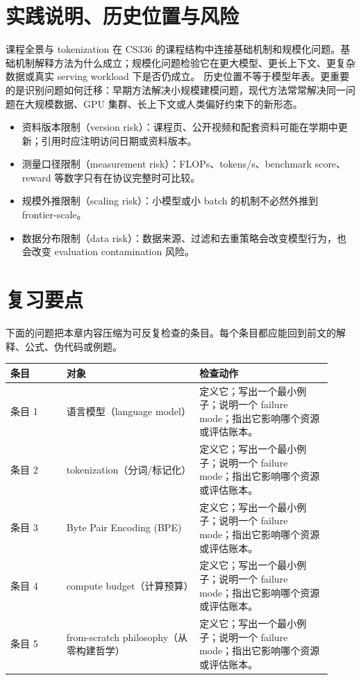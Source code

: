 \documentclass[a4paper]{article}
\begin{document}
\section{实践说明、历史位置与风险}
课程全景与 tokenization 在 CS336 的课程结构中连接基础机制和规模化问题。基础机制解释方法为什么成立；规模化问题检验它在更大模型、更长上下文、更复杂数据或真实 serving workload 下是否仍成立。
历史位置不等于模型年表。更重要的是识别问题如何迁移：早期方法解决小规模建模问题，现代方法常常解决同一问题在大规模数据、GPU 集群、长上下文或人类偏好约束下的新形态。
\begin{itemize}
\item 资料版本限制（version risk）：课程页、公开视频和配套资料可能在学期中更新；引用时应注明访问日期或资料版本。
\item 测量口径限制（measurement risk）：FLOPs、tokens/s、benchmark score、reward 等数字只有在协议完整时可比较。
\item 规模外推限制（scaling risk）：小模型或小 batch 的机制不必然外推到 frontier-scale。
\item 数据分布限制（data risk）：数据来源、过滤和去重策略会改变模型行为，也会改变 evaluation contamination 风险。
\end{itemize}
\section{复习要点}
下面的问题把本章内容压缩为可反复检查的条目。每个条目都应能回到前文的解释、公式、伪代码或例题。
\begin{longtable}{p{0.16\linewidth}p{0.38\linewidth}p{0.38\linewidth}}
\toprule
\textbf{条目} & \textbf{对象} & \textbf{检查动作}\\
\midrule
条目 1 & 语言模型（language model） & 定义它；写出一个最小例子；说明一个 failure mode；指出它影响哪个资源或评估账本。\\
条目 2 & tokenization（分词/标记化） & 定义它；写出一个最小例子；说明一个 failure mode；指出它影响哪个资源或评估账本。\\
条目 3 & Byte Pair Encoding (BPE) & 定义它；写出一个最小例子；说明一个 failure mode；指出它影响哪个资源或评估账本。\\
条目 4 & compute budget（计算预算） & 定义它；写出一个最小例子；说明一个 failure mode；指出它影响哪个资源或评估账本。\\
条目 5 & from-scratch philosophy（从零构建哲学） & 定义它；写出一个最小例子；说明一个 failure mode；指出它影响哪个资源或评估账本。\\
\bottomrule
\end{longtable}
\end{document}
